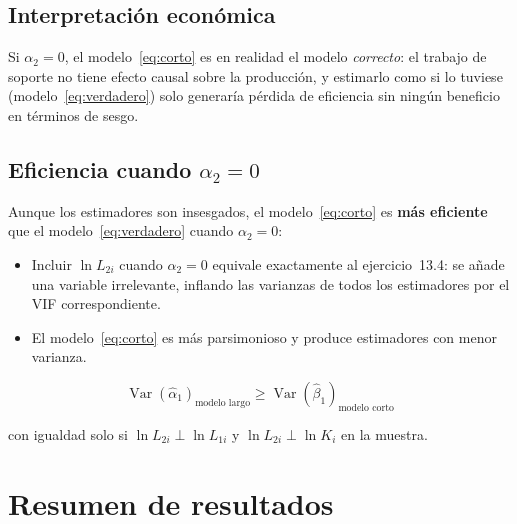 \documentclass[12pt, letterpaper]{article}
\newcommand{\Var}{\operatorname{Var}}
\begin{document}
\subsection{Interpretación económica}

Si $\alpha_2 = 0$, el modelo~\eqref{eq:corto} es en realidad el modelo
\textit{correcto}: el trabajo de soporte no tiene efecto causal sobre la
producción, y estimarlo como si lo tuviese (modelo~\eqref{eq:verdadero})
solo generaría pérdida de eficiencia sin ningún beneficio en términos de
sesgo.

\subsection{Eficiencia cuando \texorpdfstring{$\alpha_2 = 0$}{alpha2 = 0}}

Aunque los estimadores son insesgados, el modelo~\eqref{eq:corto} es
\textbf{más eficiente} que el modelo~\eqref{eq:verdadero} cuando
$\alpha_2 = 0$:

\begin{itemize}[leftmargin=1.8em]
  \item Incluir $\ln L_{2i}$ cuando $\alpha_2 = 0$ equivale exactamente al
    ejercicio~13.4: se añade una variable irrelevante, inflando las varianzas
    de todos los estimadores por el VIF correspondiente.
  \item El modelo~\eqref{eq:corto} es más parsimonioso y produce estimadores
    con menor varianza.
\end{itemize}

\begin{equation}
  \Var(\hat{\alpha}_1)_{\text{modelo largo}} \geq
  \Var(\hat{\beta}_1)_{\text{modelo corto}}
\end{equation}

con igualdad solo si $\ln L_{2i} \perp \ln L_{1i}$ y
$\ln L_{2i} \perp \ln K_i$ en la muestra.

\section{Resumen de resultados}
\end{document}
